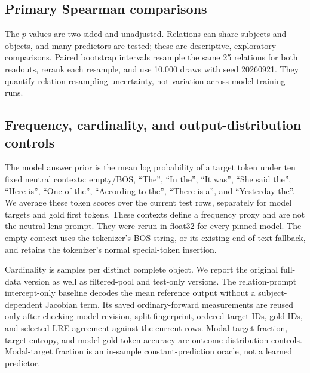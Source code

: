 \subsection{Primary Spearman comparisons}








The $p$-values are two-sided and unadjusted. Relations can share subjects
and objects, and many predictors are tested; these are descriptive,
exploratory comparisons. Paired bootstrap intervals resample the same 25
relations for both readouts, rerank each resample, and use 10,000 draws
with seed 20260921. They quantify relation-resampling uncertainty, not
variation across model training runs.

\subsection{Frequency, cardinality, and output-distribution controls}

The model answer prior is the mean log probability of a target token under
ten fixed neutral contexts: empty/BOS, ``The'', ``In the'', ``It was'',
``She said the'', ``Here is'', ``One of the'', ``According to the'',
``There is a'', and ``Yesterday the''. We average these token scores over
the current test rows, separately for model targets and gold first tokens.
These contexts define a frequency proxy and are not the neutral lens prompt.
They were rerun in float32 for every pinned model. The empty context uses
the tokenizer's BOS string, or its existing end-of-text fallback, and retains
the tokenizer's normal special-token insertion.

Cardinality is samples per distinct complete object. We report the original
full-data version as well as filtered-pool and test-only versions. The
relation-prompt intercept-only baseline decodes the mean reference output
without a subject-dependent Jacobian term. Its saved ordinary-forward
measurements are reused only after checking model revision, split fingerprint,
ordered target IDs, gold IDs, and selected-LRE agreement against the current
rows. Modal-target fraction, target entropy, and model gold-token accuracy
are outcome-distribution controls. Modal-target fraction is an in-sample
constant-prediction oracle, not a learned predictor.

